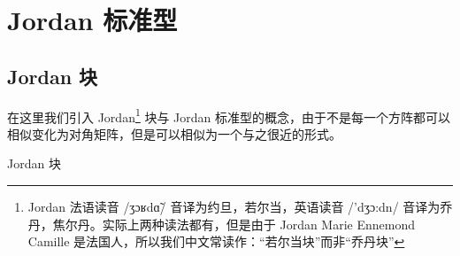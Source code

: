 \section{Jordan 标准型}




\subsection{Jordan 块}

在这里我们引入 Jordan\footnote{Jordan 法语读音 {\timesroman /ʒɔʁdɑ̃/} 音译为约旦，若尔当，英语读音 {\timesroman /'dʒɔ:dn/} 音译为乔丹，焦尔丹。实际上两种读法都有，但是由于 Jordan Marie Ennemond Camille 是法国人，所以我们中文常读作：``若尔当块''而非``乔丹块''} 块与 Jordan 标准型的概念，由于不是每一个方阵都可以相似变化为对角矩阵，但是可以相似为一个与之很近的形式。

\begin{definition}{Jordan 块}
	
\end{definition}